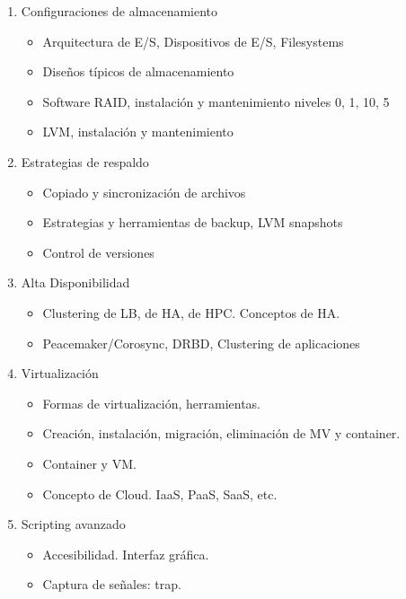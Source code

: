 \begin{enumerate}
\item Configuraciones de almacenamiento
\begin{itemize}
	\item   Arquitectura de E/S, Dispositivos de E/S, Filesystems
	\item	Diseños típicos de almacenamiento
	\item	Software RAID, instalación y mantenimiento niveles 0, 1, 10, 5 
	\item	LVM, instalación y mantenimiento	 
\end{itemize}
	
\item Estrategias de respaldo
\begin{itemize}
	\item Copiado y sincronización de archivos
	\item Estrategias y herramientas de backup, LVM snapshots
	\item Control de versiones
\end{itemize}

\item Alta Disponibilidad
\begin{itemize}
	\item Clustering de LB, de HA, de HPC. Conceptos de HA.
	\item Peacemaker/Corosync, DRBD, Clustering de aplicaciones
\end{itemize}

\item Virtualización
\begin{itemize}
	\item Formas de virtualización, herramientas. 
	\item Creación, instalación, migración, eliminación de MV y container.
        \item Container y VM.  
	\item Concepto de Cloud. IaaS, PaaS, SaaS, etc.
\end{itemize}
\item Scripting avanzado
\begin{itemize}
	\item Accesibilidad. Interfaz gráfica. 
	\item Captura de señales: trap. 
\end{itemize}
\end{enumerate}

